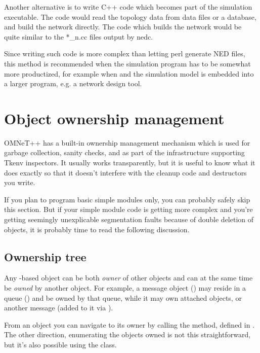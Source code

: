 Another alternative is to write C++ code which becomes part of the
simulation executable. The code would read the topology data from data
files or a database, and build the network directly.  The code which
builds the network would be quite similar to the *\_n.cc files output
by nedc.


Since writing such code is more complex than letting perl generate
NED files, this method is recommended when the simulation program
has to be somewhat more productized, for example when {\opp}
and the simulation model is embedded into a larger program, e.g.
a network design tool.




\section{Object ownership management}
\label{sec:ch-sim-lib:ownership-management}

OMNeT++ has a built-in ownership management mechanism which
is used for garbage collection, sanity checks, and as
part of the infrastructure supporting Tkenv inspectors.
It usually works transparently, but it is useful to know
what it does exactly so that it doesn't interfere
with the cleanup code and destructors you write.

If you plan to program basic simple modules only, you can probably
safely skip this section. But if your simple module code
is getting more complex and you're getting seemingly unexplicable
segmentation faults because of double deletion of objects,
it is probably time to read the following discussion.


\subsection{Ownership tree}

Any -based object can be both \textit{owner} of other
objects and can at the same time be \textit{owned} by another object.
For example, a message object () may reside
in a queue () and be owned by that queue, while it
may own attached  objects, or another message
(added to it via ).

From an object you can navigate to its owner by calling the 
method, defined in . The other direction, enumerating the
objects owned is not this straightforward, but it's also possible
using the  class.

